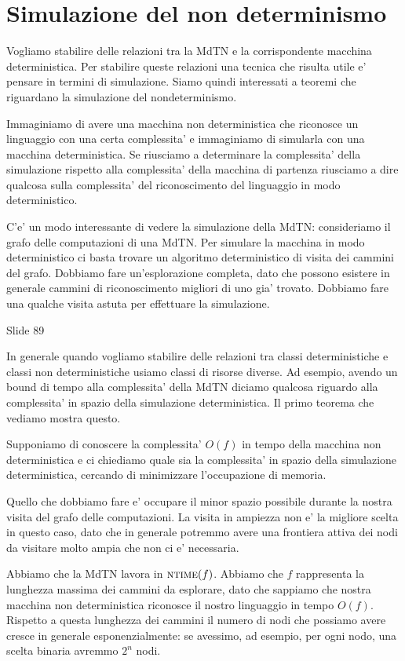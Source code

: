 \section{Simulazione del non determinismo}

Vogliamo stabilire delle relazioni tra la MdTN e la corrispondente macchina deterministica. Per
stabilire queste relazioni una tecnica che risulta utile e' pensare in termini di simulazione.
Siamo quindi interessati a teoremi che riguardano la simulazione del nondeterminismo.

Immaginiamo di avere una macchina non deterministica che riconosce un linguaggio con una certa
complessita' e immaginiamo di simularla con una macchina deterministica. Se riusciamo a determinare
la complessita' della simulazione rispetto alla complessita' della macchina di partenza riusciamo a
dire qualcosa sulla complessita' del riconoscimento del linguaggio in modo deterministico.

C'e' un modo interessante di vedere la simulazione della MdTN: consideriamo il grafo delle
computazioni di una MdTN. Per simulare la macchina in modo deterministico ci basta trovare un
algoritmo deterministico di visita dei cammini del grafo. Dobbiamo fare un'esplorazione completa,
dato che possono esistere in generale cammini di riconoscimento migliori di uno gia' trovato.
Dobbiamo fare una qualche visita astuta per effettuare la simulazione.

Slide 89

In generale quando vogliamo stabilire delle relazioni tra classi deterministiche e classi non
deterministiche usiamo classi di risorse diverse. Ad esempio, avendo un bound di tempo alla
complessita' della MdTN diciamo qualcosa riguardo alla complessita' in spazio della simulazione
deterministica. Il primo teorema che vediamo mostra questo.

Supponiamo di conoscere la complessita' $O(f)$ in tempo della macchina non deterministica e ci
chiediamo quale sia la complessita' in spazio della simulazione deterministica, cercando di
minimizzare l'occupazione di memoria.

Quello che dobbiamo fare e' occupare il minor spazio possibile durante la nostra visita del grafo
delle computazioni. La visita in ampiezza non e' la migliore scelta in questo caso, dato che in
generale potremmo avere una frontiera attiva dei nodi da visitare molto ampia che non ci e'
necessaria.

Abbiamo che la MdTN lavora in $\textsc{ntime}(f)$. Abbiamo che $f$ rappresenta la lunghezza massima dei
cammini da esplorare, dato che sappiamo che nostra macchina non deterministica riconosce il nostro
linguaggio in tempo $O(f)$. Rispetto a questa lunghezza dei cammini il numero di nodi che possiamo
avere cresce in generale esponenzialmente: se avessimo, ad esempio, per ogni nodo, una scelta
binaria avremmo $2^{n}$ nodi.

